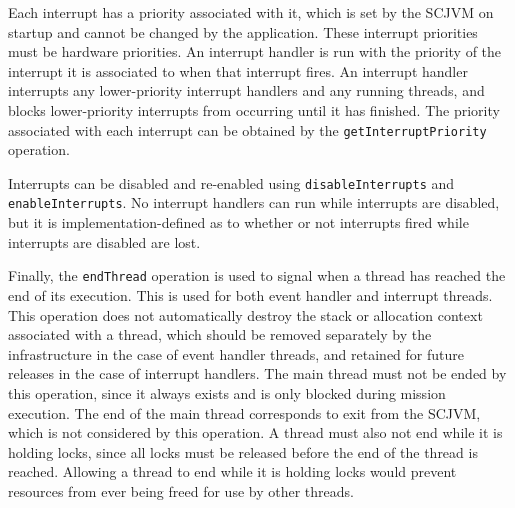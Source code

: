 Each interrupt has a priority associated with it, which is set by the
SCJVM on startup and cannot be changed by the application.
These interrupt priorities must be hardware priorities.
An interrupt handler is run with the priority of the interrupt it is
associated to when that interrupt fires.
An interrupt handler interrupts any lower-priority interrupt handlers
and any running threads, and blocks lower-priority interrupts from
occurring until it has finished.
The priority associated with each interrupt can be obtained by the
\texttt{get\-Interrupt\-Priority} operation.

Interrupts can be disabled and re-enabled using
\texttt{disableInterrupts} and \texttt{enableInterrupts}.
No interrupt handlers can run while interrupts are disabled, but it is
implementation-defined as to whether or not interrupts fired while
interrupts are disabled are lost.

Finally, the \texttt{endThread} operation is used to signal when a
thread has reached the end of its execution.
This is used for both event handler and interrupt threads.
This operation does not automatically destroy the stack or allocation
context associated with a thread, which should be removed separately
by the infrastructure in the case of event handler threads, and
retained for future releases in the case of interrupt handlers.
The main thread must not be ended by this operation, since it always
exists and is only blocked during mission execution.
The end of the main thread corresponds to exit from the SCJVM, which
is not considered by this operation.
A thread must also not end while it is holding locks, since all locks
must be released before the end of the thread is reached.
Allowing a thread to end while it is holding locks would prevent
resources from ever being freed for use by other threads.



